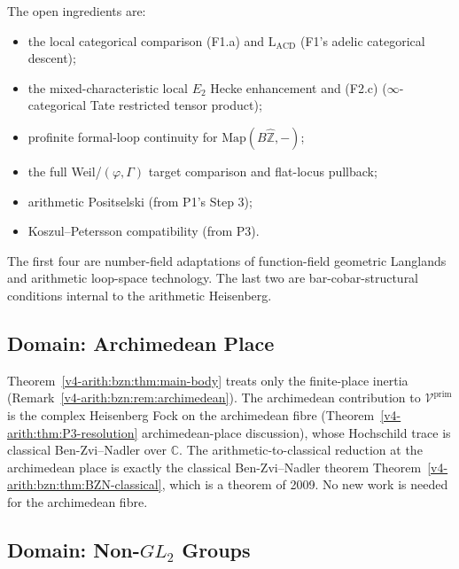 \begin{remark}
\label{v4-arith:bzn:rem:what-remains}
The open ingredients are:
\begin{itemize}
\item the local categorical comparison (F1.a) and
\(\mathrm{L}_{\mathrm{ACD}}\) (F1's adelic categorical descent);
\item the mixed-characteristic local \(E_{2}\) Hecke enhancement and
(F2.c) (\(\infty\)-categorical Tate restricted tensor product);
\item profinite formal-loop continuity for
\(\mathrm{Map}(B\widehat{\mathbb{Z}},-)\);
\item the full Weil/\((\varphi,\Gamma)\) target comparison and
flat-locus pullback;
\item arithmetic Positselski (from P1's Step 3);
\item Koszul--Petersson compatibility (from P3).
\end{itemize}
The first four are number-field adaptations of function-field
geometric Langlands and arithmetic loop-space technology. The last
two are bar-cobar-structural conditions internal to the arithmetic
Heisenberg.
\end{remark}

\subsection{Domain: Archimedean Place}

\begin{remark}
\label{v4-arith:bzn:rem:archimedean-contribution}
Theorem~\ref{v4-arith:bzn:thm:main-body} treats only the finite-place
inertia (Remark~\ref{v4-arith:bzn:rem:archimedean}). The archimedean
contribution to \(\mathcal{V}^{\mathrm{prim}}\) is the complex
Heisenberg Fock on the archimedean fibre (Theorem~\ref{v4-arith:thm:P3-resolution}
archimedean-place discussion), whose Hochschild trace is classical
Ben-Zvi--Nadler over \(\mathbb{C}\). The arithmetic-to-classical
reduction at the archimedean place is exactly the classical
Ben-Zvi--Nadler theorem Theorem~\ref{v4-arith:bzn:thm:BZN-classical},
which is a theorem of 2009. No new work is needed for the
archimedean fibre.
\end{remark}

\subsection{Domain: Non-\(GL_{2}\) Groups}

